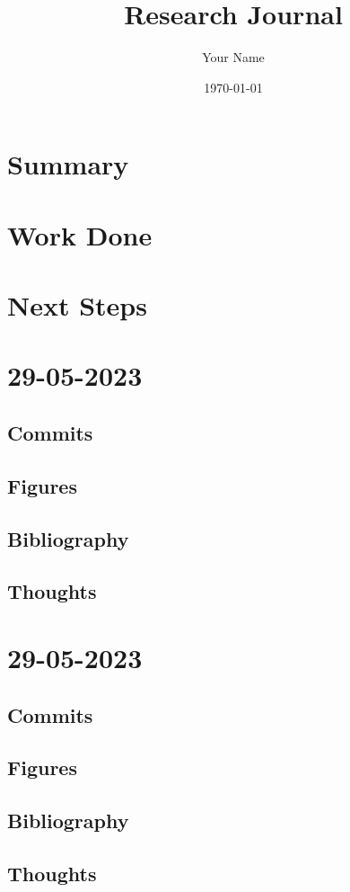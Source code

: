 \documentclass{article}
\begin{document}
\title{Research Journal}
\author{Your Name}
\date{\today}

\maketitle

\section{Summary}

\section{Work Done}

\section{Next Steps}


\section{29-05-2023}
\subsection{Commits}
\subsection{Figures}
\subsection{Bibliography}
\subsection{Thoughts}


\section{29-05-2023}
\subsection{Commits}
\subsection{Figures}
\subsection{Bibliography}
\subsection{Thoughts}
\end{document}
